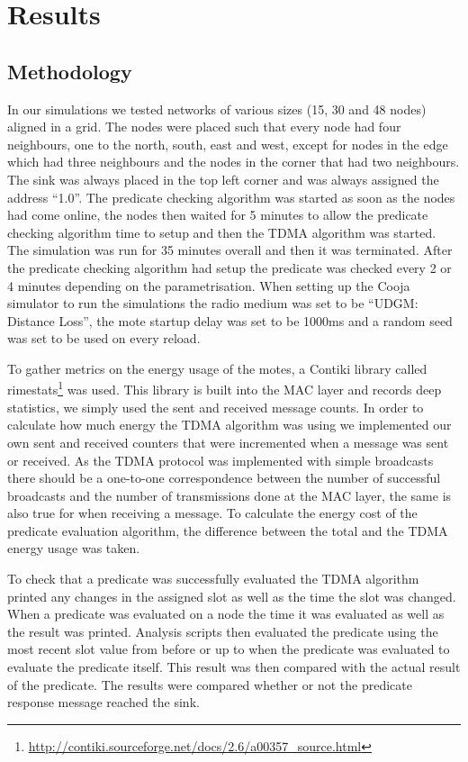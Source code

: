 \section{Results}

\subsection{Methodology}

In our simulations we tested networks of various sizes (15, 30 and 48 nodes) aligned in a grid. The nodes were placed such that every node had four neighbours, one to the north, south, east and west, except for nodes in the edge which had three neighbours and the nodes in the corner that had two neighbours. The sink was always placed in the top left corner and was always assigned the address ``1.0''. The predicate checking algorithm was started as soon as the nodes had come online, the nodes then waited for 5 minutes to allow the predicate checking algorithm time to setup and then the TDMA algorithm was started. The simulation was run for 35 minutes overall and then it was terminated. After the predicate checking algorithm had setup the predicate was checked every 2 or 4 minutes depending on the parametrisation. When setting up the Cooja simulator to run the simulations the radio medium was set to be ``UDGM: Distance Loss'', the mote startup delay was set to be 1000ms and a random seed was set to be used on every reload.

To gather metrics on the energy usage of the motes, a Contiki library called rimestats\footnote{\url{http://contiki.sourceforge.net/docs/2.6/a00357\_source.html}} was used. This library is built into the MAC layer and records deep statistics, we simply used the sent and received message counts. In order to calculate how much energy the TDMA algorithm was using we implemented our own sent and received counters that were incremented when a message was sent or received. As the TDMA protocol was implemented with simple broadcasts there should be a one-to-one correspondence between the number of successful broadcasts and the number of transmissions done at the MAC layer, the same is also true for when receiving a message. To calculate the energy cost of the predicate evaluation algorithm, the difference between the total and the TDMA energy usage was taken.

To check that a predicate was successfully evaluated the TDMA algorithm printed any changes in the assigned slot as well as the time the slot was changed. When a predicate was evaluated on a node the time it was evaluated as well as the result was printed. Analysis scripts then evaluated the predicate using the most recent slot value from before or up to when the predicate was evaluated to evaluate the predicate itself. This result was then compared with the actual result of the predicate. The results were compared whether or not the predicate response message reached the sink.

